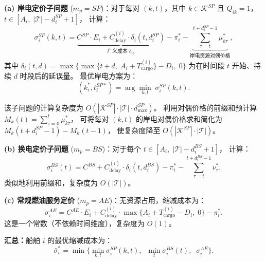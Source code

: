 \documentclass[UTF8, a4paper, 12pt]{ctexart}
\begin{document}
\medskip
\noindent\textbf{(a) 岸电定价子问题}
($m_p = SP$)：对于每对 $(k, t)$，其中 $k \in \mathcal{K}^{SP}$
且 $Q_{ik} = 1$，$t \in [A_i,\; |\mathcal{T}| - d_i^{SP} + 1]$，
计算：
\begin{equation}
  \sigma_i^{SP}(k, t)
  = \underbrace{C^{SP} \cdot E_i + C_{\text{delay}}^{(i)} \cdot \delta_i(t, d_i^{SP})}_{
    \text{广义成本 } \bar{c}_{ip}}
  - \pi_i^*
  - \underbrace{\sum_{\tau = t}^{t + d_i^{SP} - 1} \mu_{k\tau}^*}_{
    \text{岸电资源对偶价格}},
  \label{eq:price_sp}
\end{equation}
其中 $\delta_i(t, d) = \max\!\big\{\max\{t + d,\; A_i + T_{\text{cargo}}^{(i)}\} - D_i,\; 0\big\}$
为在时间段 $t$ 开始、持续 $d$ 时段后的延误量。
最优岸电方案为：
\begin{equation}
  (k_i^*, t_i^{SP*}) = \arg\min_{k, t} \; \sigma_i^{SP}(k, t).
  \label{eq:price_sp_opt}
\end{equation}

\noindent
该子问题的计算复杂度为 $O(|\mathcal{K}^{SP}| \cdot |\mathcal{T}| \cdot d_{\max}^{SP})$。
利用对偶价格的前缀和预计算
$M_{k}(t) = \sum_{\tau=0}^{t} \mu_{k\tau}^*$，
可将每对 $(k, t)$ 的岸电对偶价格求和简化为
$M_{k}(t + d_i^{SP} - 1) - M_{k}(t - 1)$，
使复杂度降至 $O(|\mathcal{K}^{SP}| \cdot |\mathcal{T}|)$。

\medskip
\noindent\textbf{(b) 换电定价子问题}
($m_p = BS$)：对于每个 $t \in [A_i,\; |\mathcal{T}| - d_i^{BS} + 1]$，
计算：
\begin{equation}
  \sigma_i^{BS}(t)
  = C^{BS} + C_{\text{delay}}^{(i)} \cdot \delta_i(t, d_i^{BS})
  - \pi_i^*
  - \sum_{\tau = t}^{t + d_i^{BS} - 1} \nu_{\tau}^*.
  \label{eq:price_bs}
\end{equation}
类似地利用前缀和，复杂度为 $O(|\mathcal{T}|)$。

\medskip
\noindent\textbf{(c) 常规燃油服务定价}
($m_p = AE$)：无资源占用，缩减成本为：
\begin{equation}
  \sigma_i^{AE}
  = C^{AE} \cdot E_i
  + C_{\text{delay}}^{(i)} \cdot \max\!\big\{A_i + T_{\text{cargo}}^{(i)} - D_i,\; 0\big\}
  - \pi_i^*.
  \label{eq:price_ae}
\end{equation}
这是一个常数（不依赖时间维度），复杂度为 $O(1)$。

\medskip
\noindent\textbf{汇总：}船舶 $i$ 的最优缩减成本为：
\begin{equation}
  \bar{\sigma}_i^* = \min\!\Big\{
    \min_{k,t} \sigma_i^{SP}(k,t),\;\;
    \min_{t} \sigma_i^{BS}(t),\;\;
    \sigma_i^{AE}
  \Big\}.
  \label{eq:price_min}
\end{equation}
\end{document}
